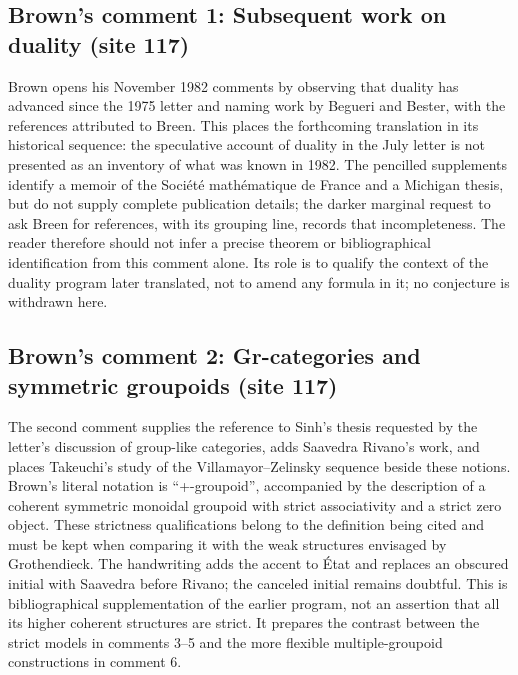 \subsection*{Brown's comment 1: Subsequent work on duality (site 117)}
Brown opens his November 1982 comments by observing that duality has advanced since the 1975 letter and naming work by Begueri and Bester, with the references attributed to Breen. This places the forthcoming translation in its historical sequence: the speculative account of duality in the July letter is not presented as an inventory of what was known in 1982. The pencilled supplements identify a memoir of the Société mathématique de France and a Michigan thesis, but do not supply complete publication details; the darker marginal request to ask Breen for references, with its grouping line, records that incompleteness. The reader therefore should not infer a precise theorem or bibliographical identification from this comment alone. Its role is to qualify the context of the duality program later translated, not to amend any formula in it; no conjecture is withdrawn here.

\subsection*{Brown's comment 2: Gr-categories and symmetric groupoids (site 117)}
The second comment supplies the reference to Sinh's thesis requested by the letter's discussion of group-like categories, adds Saavedra Rivano's work, and places Takeuchi's study of the Villamayor--Zelinsky sequence beside these notions. Brown's literal notation is ``+-groupoid'', accompanied by the description of a coherent symmetric monoidal groupoid with strict associativity and a strict zero object. These strictness qualifications belong to the definition being cited and must be kept when comparing it with the weak structures envisaged by Grothendieck. The handwriting adds the accent to État and replaces an obscured initial with Saavedra before Rivano; the canceled initial remains doubtful. This is bibliographical supplementation of the earlier program, not an assertion that all its higher coherent structures are strict. It prepares the contrast between the strict models in comments 3--5 and the more flexible multiple-groupoid constructions in comment 6.

